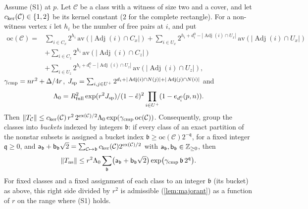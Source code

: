 \begin{corollary}\label{cor:extraction-compressed}
Assume \textup{(S1)} at $p$. Let $\mathcal C$ be a class with a witness of size two
and a cover, and let $c_{\rm ker}(\mathcal C)\in\{1,2\}$ be its kernel constant
($2$ for the complete rectangle). For a non-witness vertex $i$ let $h_i$ be the
number of free pairs at $i$, and put
\[
\begin{aligned}
 \mathrm{oc}(\mathcal C)={}&\sum_{i\in C_x}2^{h_i}\,\mathrm{av}(|\operatorname{Adj}(i)\cap C_x|)
 +\sum_{i\in U_x}2^{h_i+d^0_i-|\operatorname{Adj}(i)\cap U_x|}\,
 \mathrm{av}(|\operatorname{Adj}(i)\cap U_x|)\\
 &+\sum_{i\in C_z}2^{h_i}\,\mathrm{av}(|\operatorname{Adj}(i)\cap C_z|)\\
 &+\sum_{i\in U_z}2^{h_i+d^0_i-|\operatorname{Adj}(i)\cap U_z|}\,
 \mathrm{av}(|\operatorname{Adj}(i)\cap U_z|),
\end{aligned}
\]
$\gamma_{\rm cmp}=nr^2+\frac\Delta4r$,
$J_{\rm sp}=\sum_{i,j\in U^+}2^{d_i+|\operatorname{Adj}(i)\cap N(j)|
+|\operatorname{Adj}(j)\cap N(i)|}$ and
\[
 \Lambda_0=\frac{R_{\rm full}^2\exp(r^2J_{\rm sp})}
 {(1-\hat e)^2\prod_{i\in U^+}(1-e_{d^0_i}(p,n))}.
\]
Then
$\norm{T_{\mathcal C}}\le c_{\rm ker}(\mathcal C)\,r^2\,2^{\mathrm{ex}(\mathcal C)/2}
\Lambda_0\exp(\gamma_{\rm cmp}\,\mathrm{oc}(\mathcal C))$.
Consequently, group the classes into \emph{buckets} indexed by
integers $\mathfrak b$: if every class of an exact partition of
the nonstar subsets is assigned a bucket index
$\mathfrak b\ge\mathrm{oc}(\mathcal C)2^{-\mathfrak q}$, for a
fixed integer
$\mathfrak q\ge0$, and
$\mathsf a_{\mathfrak b}+\mathsf b_{\mathfrak b}\sqrt2=\sum_{\mathcal C\mapsto\mathfrak b}
c_{\rm ker}(\mathcal C)2^{\mathrm{ex}(\mathcal C)/2}$ with
$\mathsf a_{\mathfrak b},\mathsf b_{\mathfrak b}\in\Z_{\ge0}$, then
\[
 \norm{T_{\rm ns}}\le r^2\Lambda_0\sum_{\mathfrak b}
 \bigl(\mathsf a_{\mathfrak b}+\mathsf b_{\mathfrak b}\sqrt2\bigr)
 \exp\bigl(\gamma_{\rm cmp}\,\mathfrak b\,2^{\mathfrak q}\bigr).
\]
For fixed classes and a fixed assignment of each class to an integer
$\mathfrak b$ (its bucket) as above, this right side divided by $r^2$ is
admissible
(\cref{lem:majorant}) as a function of $r$ on the range where \textup{(S1)} holds.
\end{corollary}

